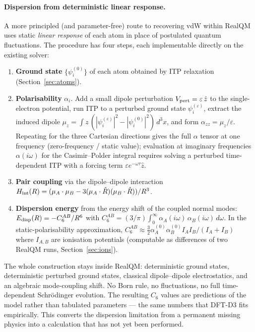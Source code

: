 \documentclass[11pt]{article}
\begin{document}
\paragraph{Dispersion from deterministic linear response.}
A more principled (and parameter-free) route to recovering vdW within RealQM uses static \emph{linear response} of each atom in place of postulated quantum fluctuations. The procedure has four steps, each implementable directly on the existing solver:
\begin{enumerate}
\item \textbf{Ground state} $\{\psi_i^{(0)}\}$ of each atom obtained by ITP relaxation (Section~\ref{sec:atoms}).
\item \textbf{Polarisability} $\alpha_i$. Add a small dipole perturbation $V_{\rm pert} = \varepsilon\, \hat z$ to the single-electron potential, run ITP to a perturbed ground state $\psi_i^{(\varepsilon)}$, extract the induced dipole $\mu_z = \int z\,(|\psi_i^{(\varepsilon)}|^2 - |\psi_i^{(0)}|^2)\,d^3x$, and form $\alpha_{zz} = \mu_z / \varepsilon$. Repeating for the three Cartesian directions gives the full $\alpha$ tensor at one frequency (zero-frequency / static value); evaluation at imaginary frequencies $\alpha(i\omega)$ for the Casimir--Polder integral requires solving a perturbed time-dependent ITP with a forcing term $\varepsilon e^{-\omega \tau}\hat z$.
\item \textbf{Pair coupling} via the dipole--dipole interaction $H_{\rm int}(R) = (\mu_A \cdot \mu_B - 3(\mu_A\cdot \hat R)(\mu_B \cdot \hat R))/R^3$.
\item \textbf{Dispersion energy} from the energy shift of the coupled normal modes: $E_{\rm disp}(R) = -C_6^{AB}/R^6$ with $C_6^{AB} = (3/\pi)\int_0^\infty \alpha_A(i\omega)\,\alpha_B(i\omega)\,d\omega$. In the static-polarisability approximation, $C_6^{AB} \approx \tfrac{3}{2}\alpha_A^{(0)}\alpha_B^{(0)} I_A I_B/(I_A+I_B)$ where $I_{A,B}$ are ionisation potentials (computable as differences of two RealQM runs, Section~\ref{sec:ions}).
\end{enumerate}
The whole construction stays inside RealQM: deterministic ground states, deterministic perturbed ground states, classical dipole--dipole electrostatics, and an algebraic mode-coupling shift. No Born rule, no fluctuations, no full time-dependent Schr\"odinger evolution. The resulting $C_6$ values are predictions of the model rather than tabulated parameters --- the same numbers that DFT-D3 fits empirically. This converts the dispersion limitation from a permanent missing physics into a calculation that has not yet been performed.
\end{document}
